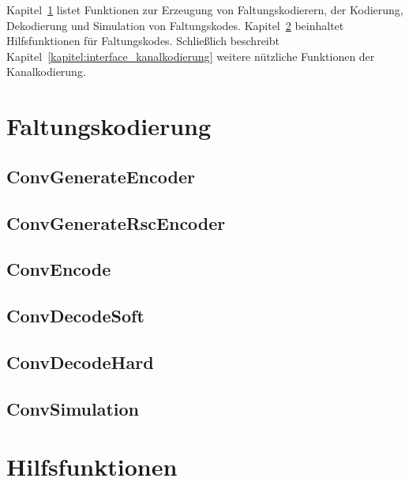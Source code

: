 
Kapitel~\ref{kapitel:interface_faltungskodierung} listet Funktionen zur Erzeugung von Faltungskodierern, der Kodierung, Dekodierung und Simulation von Faltungskodes. Kapitel~\ref{kapitel:interface_hilfsfunktionen} beinhaltet Hilfsfunktionen für Faltungskodes. Schließlich beschreibt Kapitel~\ref{kapitel:interface_kanalkodierung} weitere nützliche Funktionen der Kanalkodierung.

\section{Faltungskodierung}
\label{kapitel:interface_faltungskodierung}

\subsection{ConvGenerateEncoder}


\subsection{ConvGenerateRscEncoder}


\subsection{ConvEncode}


\subsection{ConvDecodeSoft}


\subsection{ConvDecodeHard}


\subsection{ConvSimulation}


\section{Hilfsfunktionen}
\label{kapitel:interface_hilfsfunktionen}

